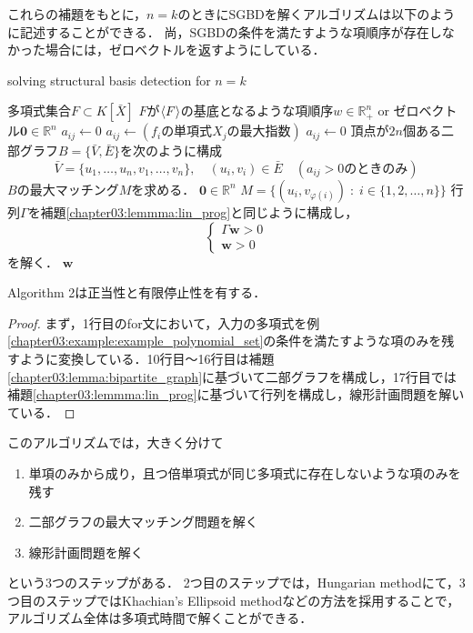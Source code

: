 これらの補題をもとに，$n=k$のときにSGBDを解くアルゴリズムは以下のように記述することができる．
尚，SGBDの条件を満たすような項順序が存在しなかった場合には，ゼロベクトルを返すようにしている．
\begin{algorithm}[htbp]
	\label{chapter03:algorithm:SGBD}
	\caption{solving structural \groebner{} basis detection for $n = k$ {\cite[Algorighm7]{sturmfels1997structural}}}
	\begin{algorithmic}[1]
		\Require 多項式集合$F \subset K[\bar{X}]$
		\Ensure $F$が$\langle F \rangle$の\groebner{}基底となるような項順序$w \in \mathbb{R}_{+}^n$ or ゼロベクトル$\bm{0} \in \mathbb{R}^n$
				\State $a_{ij} \gets 0$
			\EndIf
			\State $a_{ij} \gets (f_i\text{の単項式}X_j\text{の最大指数})$
				\State $a_{ij} \gets 0$
			\EndIf
		\EndFor
		\State 頂点が$2n$個ある二部グラフ$B = \{\bar{V}, \bar{E}\}$を次のように構成
		$$\bar{V} = \{u_1, \dots, u_n, v_1, \dots, v_n\}, \quad (u_i, v_i) \in \bar{E} \quad(a_{ij} > 0 \text{のときのみ})$$
		\State $B$の最大マッチング$M$を求める．
			\State \Return $\bm{0} \in \mathbb{R}^n$
		\Else 
			\State $M = \{(u_i, v_{\varphi(i)})\;:\; i \in \{1, 2, \dots, n\}\}$
		\EndIf
		\State 行列$\varGamma$を補題\ref{chapter03:lemmma:lin_prog}と同じように構成し，
		$$\begin{cases}
			\varGamma \bm{w} > 0\\
			\bm{w} > 0
		\end{cases}$$
		を解く．
		\State \Return $\bm{w}$
	\end{algorithmic}
\end{algorithm}

\begin{theorem}
	Algorithm 2は正当性と有限停止性を有する．
\end{theorem}
\begin{proof}
	まず，1行目のfor文において，入力の多項式を例\ref{chapter03:example:example_polynomial_set}の条件を満たすような項のみを残すように変換している．10行目〜16行目は補題\ref{chapter03:lemma:bipartite_graph}に基づいて二部グラフを構成し，17行目では補題\ref{chapter03:lemmma:lin_prog}に基づいて行列を構成し，線形計画問題を解いている．
\end{proof}
このアルゴリズムでは，大きく分けて
\begin{enumerate}
	\item 単項のみから成り，且つ倍単項式が同じ多項式に存在しないような項のみを残す
	\item 二部グラフの最大マッチング問題を解く
	\item 線形計画問題を解く
\end{enumerate}
という$3$つのステップがある．
2つ目のステップでは，Hungarian method\cite{plummer1986matching}にて，3つ目のステップではKhachian's Ellipsoid method\cite{schrijver1998theory}などの方法を採用することで，アルゴリズム全体は多項式時間で解くことができる\cite{sturmfels1997structural}．

